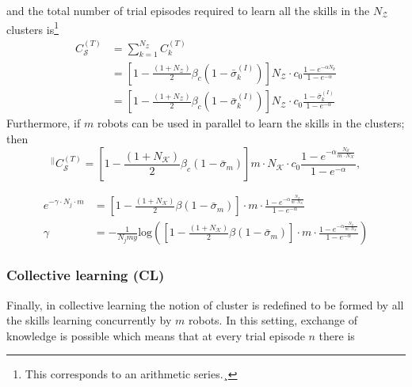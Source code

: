 and the total number of trial episodes required to learn all the skills in the $N_\mathcal{Z}$ clusters is\footnote{This corresponds to an arithmetic series.¸}
\begin{align}\label{eq:complexity_transfer_single}
	C_\mathcal{S}^{(T)} &= \sum_{k=1}^{N_\mathcal{Z}} C_{k}^{(T)}\\
	&= \left[1 - \frac{\left(1+N_\mathcal{Z}\right)}{2}\beta_c \left(1-\bar{\sigma}^{(I)}_k\right)\right] N_\mathcal{Z} \cdot  c_0 \frac{1 - e^{-\alpha N_k}}{1 - e^{-\alpha}}\\
	&= \left[1 - \frac{\left(1+N_\mathcal{Z}\right)}{2}\beta_c \left(1-\bar{\sigma}^{(I)}_k\right)\right] N_\mathcal{Z} \cdot  c_0 \frac{1 - \bar{\sigma}^{(I)}_k}{1 - e^{-\alpha}}	
\end{align}
Furthermore, if $ m $ robots can be used in parallel to learn the skills in the clusters; then
\begin{equation}\label{eq:complexity_transfer_parallel}
	{}^{\lvert \lvert}C_\mathcal{S}^{(T)} = \left[1 - \frac{\left(1+N_\mathcal{K}\right)}{2}\beta_c \left(1-\bar{\sigma}_m\right)\right] m \cdot N_\mathcal{K}  \cdot c_0 \frac{1 - e^{-\alpha \frac{N_\mathcal{S}}{m \cdot N_\mathcal{K}}}}{1 - e^{-\alpha}},
\end{equation}

\begin{tcolorbox}
\begin{align}
	e^{-\gamma \cdot N_j \cdot m}  &= \left[1 - \frac{\left(1+N_\mathcal{K}\right)}{2}\beta \left(1-\bar{\sigma}_m\right)\right]  \cdot m \cdot \frac{1 - e^{-\alpha \frac{N_\mathcal{S}}{m \cdot N_\mathcal{K}}}}{1 - e^{-\alpha}}\\
	\gamma &= -\frac{1}{N_j my}\text{log} \left( \left[1 - \frac{\left(1+N_\mathcal{K}\right)}{2}\beta \left(1-\bar{\sigma}_m\right)\right]  \cdot m \cdot \frac{1 - e^{-\alpha \frac{N_\mathcal{S}}{m \cdot N_\mathcal{K}}}}{1 - e^{-\alpha}}\right)
\end{align}
\end{tcolorbox}
\subsubsection{\textbf{Collective learning (CL)}}
Finally, in collective learning the notion of cluster is redefined to be formed by all the skills learning concurrently by $m$ robots. In this setting, exchange of knowledge is possible which means that at every trial episode $n$ there is 

